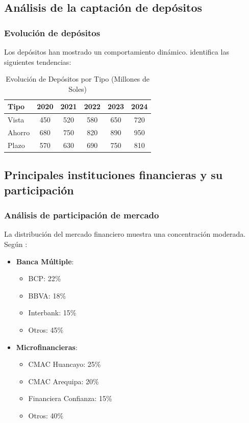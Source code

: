 \documentclass[12pt, a4paper]{article}
\begin{document}
\subsection{Análisis de la captación de depósitos}

\subsubsection{Evolución de depósitos}

Los depósitos han mostrado un comportamiento dinámico. \textcite{Vasquez2024} identifica las siguientes tendencias:

\begin{table}[ht]
\centering
\caption{Evolución de Depósitos por Tipo (Millones de Soles)}
\begin{tabular}{|l|c|c|c|c|c|}
\hline
\textbf{Tipo} & \textbf{2020} & \textbf{2021} & \textbf{2022} & \textbf{2023} & \textbf{2024} \\
\hline
Vista & 450 & 520 & 580 & 650 & 720 \\
Ahorro & 680 & 750 & 820 & 890 & 950 \\
Plazo & 570 & 630 & 690 & 750 & 810 \\
\hline
\end{tabular}
\end{table}

\subsection{Principales instituciones financieras y su participación}

\subsubsection{Análisis de participación de mercado}

La distribución del mercado financiero muestra una concentración moderada. Según \textcite{Castro2024}:

\begin{itemize}
    \item \textbf{Banca Múltiple}:
    \begin{itemize}
        \item BCP: 22\%
        \item BBVA: 18\%
        \item Interbank: 15\%
        \item Otros: 45\%
    \end{itemize}
    
    \item \textbf{Microfinancieras}:
    \begin{itemize}
        \item CMAC Huancayo: 25\%
        \item CMAC Arequipa: 20\%
        \item Financiera Confianza: 15\%
        \item Otros: 40\%
    \end{itemize}
\end{itemize}
\end{document}

